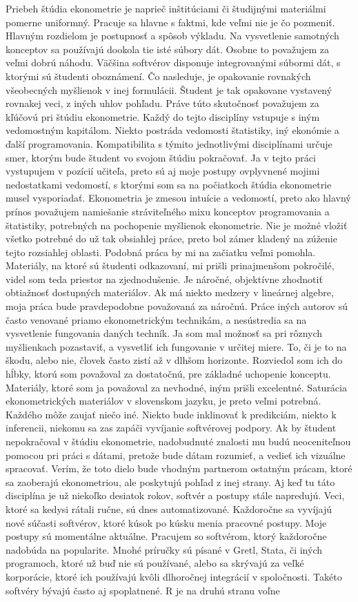 \documentclass[]{tukediphc}
\begin{document}
Priebeh štúdia ekonometrie je naprieč inštitúciami či študijnými materiálmi pomerne uniformný. Pracuje sa hlavne s faktmi, kde veľmi nie je čo pozmeniť. Hlavným rozdielom je postupnosť a spôsob výkladu. Na vysvetlenie samotných konceptov sa používajú dookola tie isté súbory dát. Osobne to považujem za veľmi dobrú náhodu. Väčšina softvérov disponuje integrovanými súbormi dát, s ktorými sú študenti oboznámení. Čo nasleduje, je opakovanie rovnakých všeobecných myšlienok v inej formulácii. Študent je tak opakovane vystavený rovnakej veci, z iných uhlov pohľadu. Práve túto skutočnosť považujem za kľúčovú pri štúdiu ekonometrie. Každý do tejto disciplíny vstupuje s iným vedomostným kapitálom. Niekto postráda vedomosti štatistiky, iný ekonómie a ďalší programovania. Kompatibilita s týmito jednotlivými disciplínami určuje smer, ktorým bude študent vo svojom štúdiu pokračovať. Ja v tejto práci vystupujem v pozícií učiteľa, preto sú aj moje postupy ovplyvnené mojimi nedostatkami vedomostí, s ktorými som sa na počiatkoch štúdia ekonometrie musel vysporiadať. Ekonometria je zmesou intuície a vedomostí, preto ako hlavný prínos považujem namiešanie stráviteľného mixu konceptov programovania a štatistiky, potrebných na pochopenie myšlienok ekonometrie. Nie je možné vložiť všetko potrebné do už tak obsiahlej práce, preto bol zámer kladený na zúženie tejto rozsiahlej oblasti. Podobná práca by mi na začiatku veľmi pomohla. Materiály, na ktoré sú študenti odkazovaní, mi prišli prinajmenšom pokročilé, videl som teda priestor na zjednodušenie. Je náročné, objektívne zhodnotiť obtiažnosť dostupných materiálov. Ak má niekto medzery v lineárnej algebre, moja práca bude pravdepodobne považovaná za náročnú. Práce iných autorov sú často venované priamo ekonometrickým technikám, a nesústredia sa na vysvetlenie fungovania daných techník. Ja som mal možnosť sa pri rôznych myšlienkach pozastaviť, a vysvetliť ich fungovanie v určitej miere. To, či je to na škodu, alebo nie, človek často zistí až v dlhšom horizonte. Rozviedol som ich do hĺbky, ktorú som považoval za dostatočnú, pre základné uchopenie konceptu. Materiály, ktoré som ja považoval za nevhodné, iným prišli excelentné. Saturácia ekonometrických materiálov v slovenskom jazyku, je preto veľmi potrebná. Každého môže zaujať niečo iné. Niekto bude inklinovať k predikciám, niekto k inferencii, niekomu sa zas zapáči vyvíjanie softvérovej podpory. Ak by študent nepokračoval v štúdiu ekonometrie, nadobudnuté znalosti mu budú neoceniteľnou pomocou pri práci s dátami, pretože bude dátam rozumieť, a vedieť ich vizuálne spracovať. Verím, že toto dielo bude vhodným partnerom ostatným prácam, ktoré sa zaoberajú ekonometriou, ale poskytujú pohľad z inej strany. Aj keď tu táto disciplína je už niekoľko desiatok rokov, softvér a postupy stále napredujú. Veci, ktoré sa kedysi rátali ručne, sú dnes automatizované. Každoročne sa vyvíjajú nové súčasti softvérov, ktoré kúsok po kúsku menia pracovné postupy. Moje postupy sú momentálne aktuálne. Pracujem so softvérom, ktorý každoročne nadobúda na popularite. Mnohé príručky sú písané v Gretl, Stata, či iných programoch, ktoré už buď nie sú používané, alebo sa skrývajú za veľké korporácie, ktoré ich používajú kvôli dlhoročnej integrácií v spoločnosti. Takéto softvéry bývajú často aj spoplatnené. R je na druhú stranu voľne 
\end{document}

